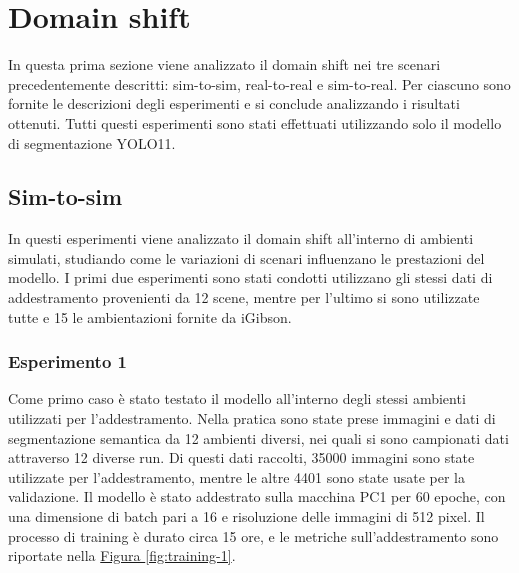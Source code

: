 \documentclass[12pt]{report}
\begin{document}
\section{Domain shift}
\label{sec:studio_domain_shift}

In questa prima sezione viene analizzato il domain shift nei tre scenari precedentemente descritti: sim-to-sim, real-to-real e sim-to-real. Per ciascuno sono fornite le descrizioni degli esperimenti e si conclude analizzando i risultati ottenuti. Tutti questi esperimenti sono stati effettuati utilizzando solo il modello di segmentazione YOLO11.

\subsection{Sim-to-sim}
\label{sec:sim_to_sim}

In questi esperimenti viene analizzato il domain shift all'interno di ambienti simulati, studiando come le variazioni di scenari influenzano le prestazioni del modello. I primi due esperimenti sono stati condotti utilizzano gli stessi dati di addestramento provenienti da 12 scene, mentre per l'ultimo si sono utilizzate tutte e 15 le ambientazioni fornite da iGibson.

\subsubsection{Esperimento 1}
\label{sec:esperimento_1}

Come primo caso è stato testato il modello all'interno degli stessi ambienti utilizzati per l'addestramento. Nella pratica sono state prese immagini e dati di segmentazione semantica da 12 ambienti diversi, nei quali si sono campionati dati attraverso 12 diverse run. Di questi dati raccolti, 35000 immagini sono state utilizzate per l'addestramento, mentre le altre 4401 sono state usate per la validazione. Il modello è stato addestrato sulla macchina PC1 per 60 epoche, con una dimensione di batch pari a 16 e risoluzione delle immagini di 512 pixel. Il processo di training è durato circa 15 ore, e le metriche sull'addestramento sono riportate nella \hyperref[fig:training-1]{Figura \ref{fig:training-1}}.
\end{document}
